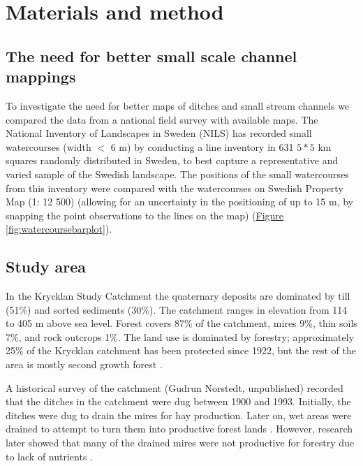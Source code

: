\documentclass[]{interact}
\theoremstyle{plain}%
\theoremstyle{definition}
\theoremstyle{remark}
\begin{document}
\section{Materials and method}
\label{method}

\subsection{The need for better small scale channel mappings}
To investigate the need for better maps of ditches and small stream channels we compared the data from a national field survey with available maps. The National Inventory of Landscapes in Sweden (NILS) has recorded small watercourses (width $<$ 6 m) by conducting a line inventory in 631 $5*5$ km squares randomly distributed in Sweden, to best capture a representative and varied sample of the Swedish landscape. The positions of the small watercourses from this inventory were compared with the watercourses on Swedish Property Map (1: 12 500) (allowing for an uncertainty in the positioning of up to 15 m, by snapping the point observations to the lines on the map) (\hyperref[fig:watercoursebarplot]{Figure} \ref{fig:watercoursebarplot}).

\subsection{Study area}
In the Krycklan Study Catchment the quaternary deposits are dominated by till (51\%) and sorted sediments (30\%). The catchment ranges in elevation from 114 to 405 m above sea level. Forest covers 87\% of the catchment, mires 9\%, thin soils 7\%, and rock outcrops 1\%. The land use is dominated by forestry; approximately 25\% of the Krycklan catchment has been protected since 1922, but  the rest of the area is mostly second growth forest \citep{krycklancatchment}. 

A historical survey of the catchment (Gudrun Norstedt, unpublished) recorded  that the ditches in the catchment were dug between 1900 and 1993. Initially, the ditches were dug to drain the mires for hay production. Later on, wet areas were drained to attempt to turn them into productive forest lands \citep{paivanen}. However, research later showed that many of the drained mires were not productive for forestry due to lack of nutrients \citep{sikstrom}.
\end{document}
